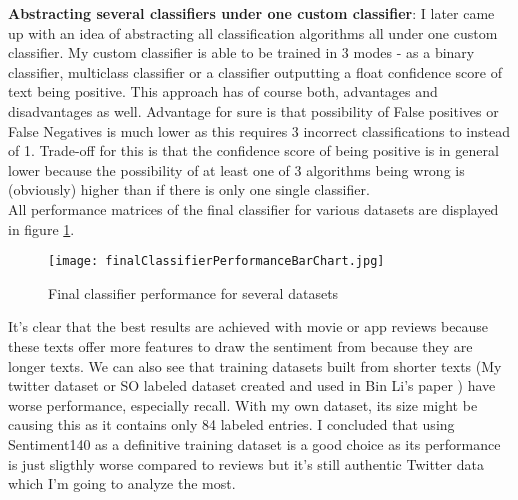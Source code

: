 \textbf{Abstracting several classifiers under one custom classifier}:
I later came up with an idea of abstracting all classification algorithms all under one custom classifier. My custom classifier is able to be trained in 3 modes - as a binary classifier, multiclass classifier or a classifier outputting a float confidence score of text being positive.
This approach has of course both, advantages and disadvantages as well. Advantage for sure is that possibility of False positives or False Negatives is much lower as this requires 3 incorrect classifications to instead of 1. Trade-off for this is that the confidence score of being positive is in general lower because the possibility of at least one of 3 algorithms being wrong is (obviously) higher than if there is only one single classifier.\\

All performance matrices of the final classifier for various datasets are displayed in figure \ref{fig:finalClassifierPerformanceBarChart}.
\\

\begin{figure}%
    \centering
	\texttt{[image: finalClassifierPerformanceBarChart.jpg]}
    \caption{Final classifier performance for several datasets}%
    \label{fig:finalClassifierPerformanceBarChart}%
\end{figure}

It's clear that the best results are achieved with movie or app reviews because these texts offer more features to draw the sentiment from because they are longer texts. We can also see that training datasets built from shorter texts (My twitter dataset or SO labeled dataset created and used in Bin Li's paper ) have worse performance, especially recall. With my own dataset, its size might be causing this as it contains only 84 labeled entries. I concluded that using Sentiment140 as a definitive training dataset is a good choice as its performance is just sligthly worse compared to reviews but it's still authentic Twitter data which I'm going to analyze the most.